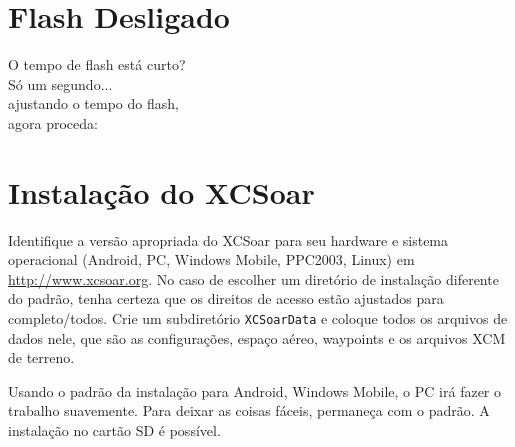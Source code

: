 \documentclass[a4paper,12pt,utf8]{scrreprt}
\begin{document}
\section*{{\color[rgb]{.9,.85,0}Flash} Desligado}

\vspace{2em}
\hspace*{1cm} O tempo de flash está curto?\\
\hspace*{4cm} Só um segundo...\\
\hspace*{6cm} ajustando o tempo do flash,\\
\hspace*{10cm} agora proceda: 


\setlength{\parskip}{0.3\baselineskip}
\newpage
\section{Instalação do XCSoar }\label{ch:XCSinstall}


Identifique a versão apropriada do XCSoar para seu hardware e sistema operacional \textsf{(Android, PC, Windows Mobile, PPC2003, Linux)} 
em \url{http://www.xcsoar.org}.
No caso de escolher um diretório de instalação diferente do padrão, tenha certeza que os direitos de acesso estão ajustados para completo/todos.  Crie um subdiretório \texttt{XCSoarData} e coloque todos os arquivos de dados nele, que são as configurações, espaço aéreo, waypoints e os arquivos XCM de terreno.

Usando o padrão da instalação para Android, Windows Mobile, o PC irá fazer o trabalho suavemente.  Para deixar as coisas fáceis, permaneça com o padrão.  A instalação no cartão SD é possível.
\end{document}
